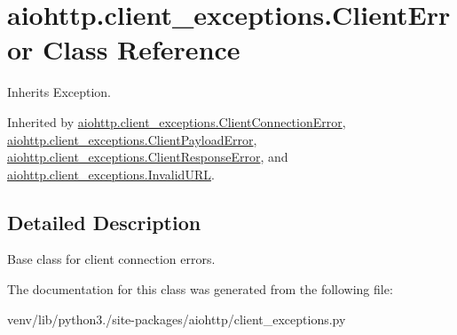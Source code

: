 \hypertarget{classaiohttp_1_1client__exceptions_1_1_client_error}{}\section{aiohttp.\+client\+\_\+exceptions.\+Client\+Error Class Reference}
\label{classaiohttp_1_1client__exceptions_1_1_client_error}


Inherits Exception.



Inherited by \hyperlink{classaiohttp_1_1client__exceptions_1_1_client_connection_error}{aiohttp.\+client\+\_\+exceptions.\+Client\+Connection\+Error}, \hyperlink{classaiohttp_1_1client__exceptions_1_1_client_payload_error}{aiohttp.\+client\+\_\+exceptions.\+Client\+Payload\+Error}, \hyperlink{classaiohttp_1_1client__exceptions_1_1_client_response_error}{aiohttp.\+client\+\_\+exceptions.\+Client\+Response\+Error}, and \hyperlink{classaiohttp_1_1client__exceptions_1_1_invalid_u_r_l}{aiohttp.\+client\+\_\+exceptions.\+Invalid\+U\+RL}.



\subsection{Detailed Description}
\begin{DoxyVerb}Base class for client connection errors.\end{DoxyVerb}
 

The documentation for this class was generated from the following file\+:\begin{DoxyCompactItemize}
\item 
venv/lib/python3./site-\/packages/aiohttp/client\+\_\+exceptions.\+py\end{DoxyCompactItemize}
